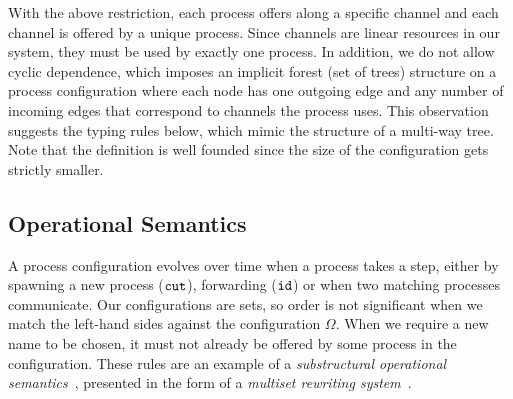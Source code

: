 \documentclass[submission,copyright,creativecommons]{eptcs}
\begin{document}
With the above restriction, each process offers along a specific channel and each channel is offered by a unique process. Since channels are linear resources in our system, they must be used by exactly one process. In addition, we do not allow cyclic dependence, which imposes an implicit forest (set of trees) structure on a process configuration where each node has one outgoing edge
and any number of incoming edges that correspond to channels the process uses. This observation suggests the typing rules below, which mimic the structure of a multi-way tree. Note that the definition is well founded since the size of the configuration gets strictly smaller.



\subsection{Operational Semantics}

A process configuration evolves over time when a process takes a step, either by spawning a new process ($\texttt{cut}$), forwarding ($\texttt{id}$) or when two matching processes communicate. Our configurations are sets, so order is not significant when we match the left-hand sides against the configuration $\Omega$.  When we require a new name to be chosen, it must not already be offered by some process in the configuration.  These rules are an example of
a \emph{substructural operational semantics}~\cite{Simmons12}, presented in the form of a \emph{multiset rewriting system}~\cite{CervesatoS09}.
\end{document}

